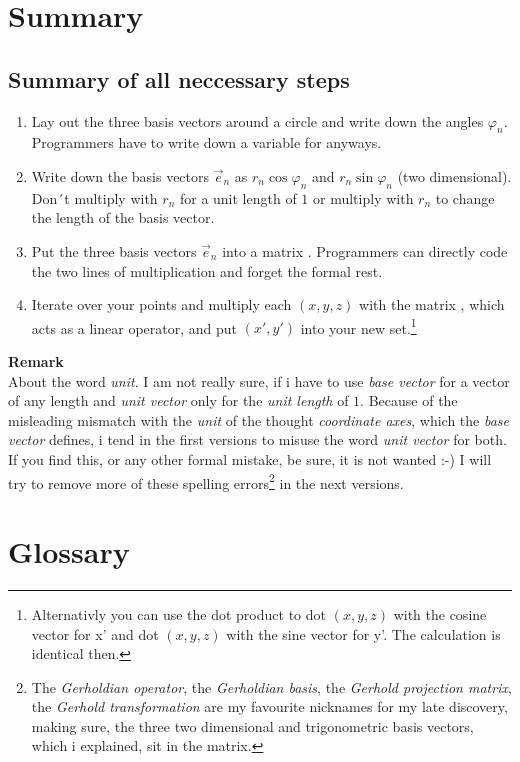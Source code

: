 \documentclass[a4paper]{article}
\begin{document}
\section{Summary}

\subsection{Summary of all neccessary steps}
\begin{enumerate}
\item Lay out the three basis vectors around a circle and write down the angles $\varphi_{n}$. Programmers have to write down a variable for anyways.
\item Write down the basis vectors $\vec{e}_{n}$ as $r_{n} \cos \varphi_{n}$ and $r_{n} \sin \varphi_{n}$ (two dimensional). Don´t multiply with $r_{n}$ for a unit length of $1$ or multiply with $r_{n}$ to change the length of the basis vector.
\item Put the three basis vectors $\vec{e}_{n}$ into a matrix . Programmers can directly code the two lines of multiplication and forget the formal rest.
\item Iterate over your points and multiply each $(x,y,z)$ with the matrix , which acts as a linear operator, and put $(x',y')$ into your new set.\footnote{Alternativly you can use the dot product to dot $(x,y,z)$ with the cosine vector for x' and dot $(x,y,z)$ with the sine vector for y'. The calculation is identical then.}
\end{enumerate}

\textbf{Remark}\\
About the word \emph{unit}. I am not really sure, if i have to use \emph{base vector} for a vector of any length and \emph{unit vector} only for the \emph{unit length} of $1$. Because of the misleading mismatch with the \emph{unit} of the thought \emph{coordinate axes}, which the \emph{base vector} defines, i tend in the first versions to misuse the word \emph{unit vector} for both. If you find this, or any other formal mistake, be sure, it is not wanted :-) I will try to remove more of these spelling errors\footnote{The \emph{Gerholdian operator}, the \emph{Gerholdian basis}, the \emph{Gerhold projection matrix}, the \emph{Gerhold transformation} are my favourite nicknames for my late discovery, making sure, the three two dimensional and trigonometric basis vectors, which i explained, sit in the matrix.} in the next versions.
\section{Glossary}
\end{document}
